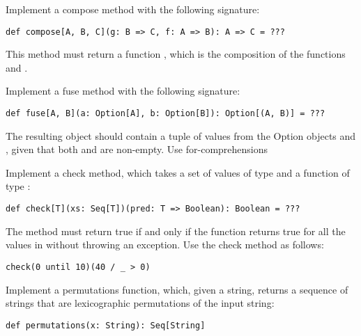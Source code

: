 \documentclass[11pt]{article}
\begin{document}
\begin{myExercise}
Implement a compose method with the following signature:
\begin{lstlisting}
def compose[A, B, C](g: B => C, f: A => B): A => C = ???
\end{lstlisting}
This method must return a function , which is the composition of the
functions  and .
\end{myExercise}

\begin{myExercise}
Implement a fuse method with the following signature:
\begin{lstlisting}
def fuse[A, B](a: Option[A], b: Option[B]): Option[(A, B)] = ???
\end{lstlisting}
The resulting  object should contain a tuple of values from the Option objects  and , given that both  and  are non-empty. Use for-comprehensions
\end{myExercise}

\begin{myExercise}
Implement a check method, which takes a set of values of type  and a function of type :
\begin{lstlisting}
def check[T](xs: Seq[T])(pred: T => Boolean): Boolean = ???
\end{lstlisting}
The method must return true if and only if the  function returns true for all the values in  without throwing an exception. Use the check method as follows:
\begin{lstlisting}
check(0 until 10)(40 / _ > 0)
\end{lstlisting}
\end{myExercise}


\begin{myExercise}
Implement a permutations function, which, given a string, returns a sequence of strings that are lexicographic permutations of the input string:
\begin{lstlisting}
def permutations(x: String): Seq[String]
\end{lstlisting}
\end{myExercise}
\end{document}
